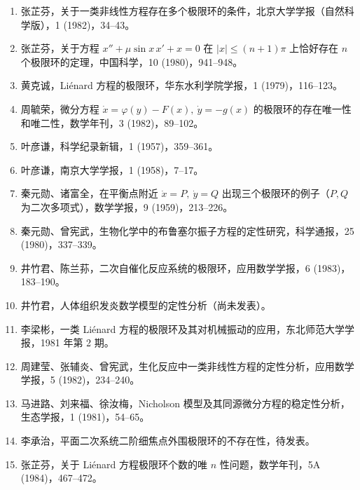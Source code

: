 \begin{enumerate}
\item 张芷芬，关于一类非线性方程存在多个极限环的条件，北京大学学报（自然科学版），1 (1982)，34--43。
\item 张芷芬，关于方程 $x''+\mu\sin x\,x'+x=0$ 在 $|x|\leqslant(n+1)\pi$ 上恰好存在 $n$ 个极限环的定理，中国科学，10 (1980)，941--948。
\item 黄克诚，Liénard 方程的极限环，华东水利学院学报，1 (1979)，116--123。
\item 周毓荣，微分方程 $\dot x=\varphi(y)-F(x),\ \dot y=-g(x)$ 的极限环的存在唯一性和唯二性，数学年刊，3 (1982)，89--102。
\item 叶彦谦，科学纪录新辑，1 (1957)，359--361。
\item 叶彦谦，南京大学学报，1 (1958)，7--17。
\item 秦元勋、诸富全，在平衡点附近 $\dot x=P,\ \dot y=Q$ 出现三个极限环的例子（$P,Q$ 为二次多项式），数学学报，9 (1959)，213--226。
\item 秦元勋、曾宪武，生物化学中的布鲁塞尔振子方程的定性研究，科学通报，25 (1980)，337--339。
\item 井竹君、陈兰荪，二次自催化反应系统的极限环，应用数学学报，6 (1983)，183--190。
\item 井竹君，人体组织发炎数学模型的定性分析（尚未发表）。
\item 李梁彬，一类 Liénard 方程的极限环及其对机械振动的应用，东北师范大学学报，1981 年第 2 期。
\item 周建莹、张辅炎、曾宪武，生化反应中一类非线性方程的定性分析，应用数学学报，5 (1982)，234--240。
\item 马进路、刘来福、徐汝梅，Nicholson 模型及其同源微分方程的稳定性分析，生态学报，1 (1981)，54--65。
\item 李承治，平面二次系统二阶细焦点外围极限环的不存在性，待发表。
\item 张芷芬，关于 Liénard 方程极限环个数的唯 $n$ 性问题，数学年刊，5A (1984)，467--472。
\end{enumerate}

\endinput
